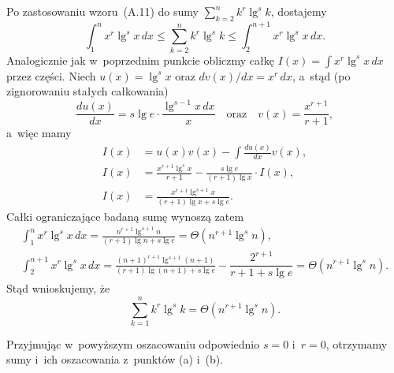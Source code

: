 \subproblem %
Po zastosowaniu wzoru~(A.11) do sumy $\sum_{k=2}^nk^r\lg^sk$, dostajemy
\[
	\int_1^nx^r\lg^sx\,dx \le \sum_{k=2}^nk^r\lg^sk \le \int_2^{n+1}x^r\lg^sx\,dx.
\]
Analogicznie jak w~poprzednim punkcie obliczmy całkę $I(x) = \int x^r\lg^sx\,dx$ przez części. Niech $u(x)=\lg^sx$ oraz $dv(x)/dx=x^r\,dx$, a~stąd (po zignorowaniu stałych całkowania)
\[
	\frac{du(x)}{dx} = s\lg e\cdot\frac{\lg^{s-1}x\,dx}{x} \quad\text{oraz}\quad v(x) = \frac{x^{r+1}}{r+1},
\]
a~więc mamy
\begin{align*}
	I(x) &= u(x)v(x)-\int\frac{du(x)}{dx}v(x), \\
	I(x) &= \frac{x^{r+1}\lg^sx}{r+1}-\frac{s\lg e}{(r+1)\lg x}\cdot I(x), \\
	I(x) &= \frac{x^{r+1}\lg^{s+1}x}{(r+1)\lg x+s\lg e}.
\end{align*}
Całki ograniczające badaną sumę wynoszą zatem
\begin{gather*}
	{\int_1^nx^r\lg^sx\,dx} = \frac{n^{r+1}\lg^{s+1}n}{(r+1)\lg n+s\lg e} = \Theta(n^{r+1}\lg^sn), \\[2mm]
	{\int_2^{n+1}x^r\lg^sx\,dx} = \frac{(n+1)^{r+1}\lg^{s+1}(n+1)}{(r+1)\lg(n+1)+s\lg e}-\dfrac{2^{r+1}}{r+1+s\lg e} = \Theta(n^{r+1}\lg^sn).
\end{gather*}
Stąd wnioskujemy, że
\[
	\sum_{k=1}^nk^r\lg^sk = \Theta(n^{r+1}\lg^sn).
\]

Przyjmując w~powyższym oszacowaniu odpowiednio $s=0$ i~$r=0$, otrzymamy sumy i~ich oszacowania z~punktów (a) i~(b).

\endinput
